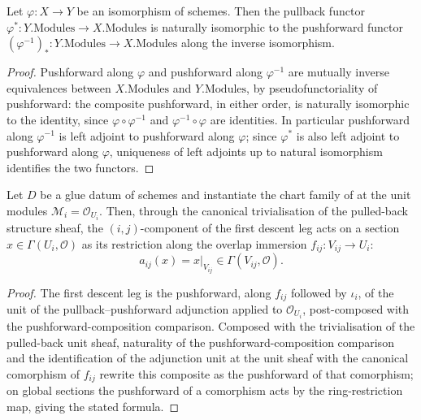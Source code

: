 \begin{lemma}
  \label{lem:pullback_iso_pushforward_inv}
  \leanok
  Let \(\varphi : X \to Y\) be an isomorphism of schemes. Then the pullback
  functor \(\varphi^{*} : Y.\mathrm{Modules} \to X.\mathrm{Modules}\) is
  naturally isomorphic to the pushforward functor
  \((\varphi^{-1})_{*} : Y.\mathrm{Modules} \to X.\mathrm{Modules}\) along
  the inverse isomorphism.
\end{lemma}
\begin{proof}\leanok
  Pushforward along \(\varphi\) and pushforward along \(\varphi^{-1}\) are
  mutually inverse equivalences between \(X.\mathrm{Modules}\) and
  \(Y.\mathrm{Modules}\), by pseudofunctoriality of pushforward: the
  composite pushforward, in either order, is naturally isomorphic to the
  identity, since \(\varphi \circ \varphi^{-1}\) and
  \(\varphi^{-1} \circ \varphi\) are identities. In particular pushforward
  along \(\varphi^{-1}\) is left adjoint to pushforward along \(\varphi\);
  since \(\varphi^{*}\) is also left adjoint to pushforward along
  \(\varphi\), uniqueness of left adjoints up to natural isomorphism
  identifies the two functors.
\end{proof}

\begin{lemma}
  \label{lem:glue_legA_unit_restriction}
  \leanok
  Let \(D\) be a glue datum of schemes and instantiate the chart family of
   at the unit modules
  \(\mathcal M_i = \mathcal O_{U_i}\). Then, through the canonical
  trivialisation of the pulled-back structure sheaf, the \((i,j)\)-component
  of the first descent leg acts on a section \(x \in \Gamma(U_i, \mathcal
  O)\) as its restriction along the overlap immersion
  \(f_{ij} : V_{ij} \to U_i\):
  \[
    a_{ij}(x) = x|_{V_{ij}} \in \Gamma(V_{ij}, \mathcal O).
  \]
\end{lemma}
\begin{proof}\leanok
  The first descent leg is the pushforward, along \(f_{ij}\) followed by
  \(\iota_i\), of the unit of the pullback--pushforward adjunction applied to
  \(\mathcal O_{U_i}\), post-composed with the pushforward-composition
  comparison. Composed with the trivialisation of the pulled-back unit
  sheaf, naturality of the pushforward-composition comparison and the
  identification of the adjunction unit at the unit sheaf with the
  canonical comorphism of \(f_{ij}\) rewrite this composite as the
  pushforward of that comorphism; on global sections the pushforward of a
  comorphism acts by the ring-restriction map, giving the stated formula.
\end{proof}

